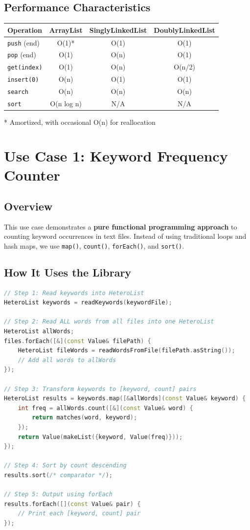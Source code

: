 \documentclass[11pt,a4paper]{article}
\begin{document}
\subsection{Performance Characteristics}

\begin{center}
\begin{tabular}{|l|c|c|c|}
\hline
\textbf{Operation} & \textbf{ArrayList} & \textbf{SinglyLinkedList} & \textbf{DoublyLinkedList} \\
\hline
\texttt{push} (end) & O(1)* & O(1) & O(1) \\
\texttt{pop} (end) & O(1) & O(n) & O(1) \\
\texttt{get(index)} & O(1) & O(n) & O(n/2) \\
\texttt{insert(0)} & O(n) & O(1) & O(1) \\
\texttt{search} & O(n) & O(n) & O(n) \\
\texttt{sort} & O(n log n) & N/A & N/A \\
\hline
\end{tabular}
\end{center}

* Amortized, with occasional O(n) for reallocation

\section{Use Case 1: Keyword Frequency Counter}

\subsection{Overview}

This use case demonstrates a \textbf{pure functional programming approach} to counting keyword occurrences in text files. Instead of using traditional loops and hash maps, we use \texttt{map()}, \texttt{count()}, \texttt{forEach()}, and \texttt{sort()}.

\subsection{How It Uses the Library}

\begin{lstlisting}[language=C++]
// Step 1: Read keywords into HeteroList
HeteroList keywords = readKeywords(keywordFile);

// Step 2: Read ALL words from all files into one HeteroList
HeteroList allWords;
files.forEach([&](const Value& filePath) {
    HeteroList fileWords = readWordsFromFile(filePath.asString());
    // Add all words to allWords
});

// Step 3: Transform keywords to [keyword, count] pairs
HeteroList results = keywords.map([&allWords](const Value& keyword) {
    int freq = allWords.count([&](const Value& word) {
        return matches(word, keyword);
    });
    return Value(makeList({keyword, Value(freq)}));
});

// Step 4: Sort by count descending
results.sort(/* comparator */);

// Step 5: Output using forEach
results.forEach([](const Value& pair) {
    // Print each [keyword, count] pair
});
\end{lstlisting}
\end{document}
